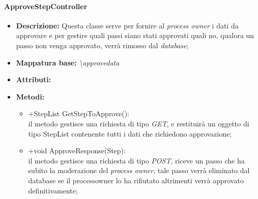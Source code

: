 \paragraph{ApproveStepController}%
\begin{itemize}
	\item \textbf{Descrizione: } Questa classe serve per fornire al \textit{process owner} i dati da approvare e per gestire quali passi siano stati approvati quali no, qualora un passo non venga approvato, verrà rimosso dal \textit{database};
	\item \textbf{Mappatura base: } \textit{\textbackslash approvedata}
	\item \textbf{Attributi: } 
	\item \textbf{Metodi: }\begin{itemize}
					\item +StepList GetStepToApprove():\\
					 il metodo gestisce una richiesta di tipo \textit{GET}, e restituirà un oggetto di tipo StepList contenente tutti i dati che richiedono approvazione;
					\item +void ApproveResponse(Step):\\
					il metodo gestisce una richiesta di tipo \textit{POST}, riceve un passo che ha subito la moderazione del \textit{process owner}, tale passo verrà eliminato dal database se il processowner lo ha rifiutato altrimenti verrà approvato definitivamente;  
				\end{itemize}
\end{itemize}